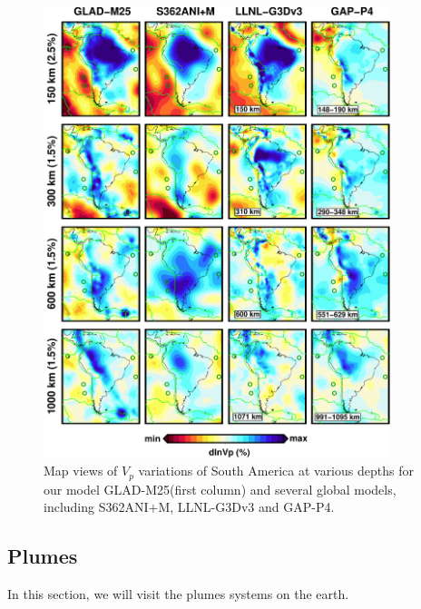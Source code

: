 \documentclass[extra,mreferee]{gji}
\begin{document}
\begin{figure}
\includegraphics[width=0.9\textwidth]{figures/depth_slice/south_america_vp.pdf}
  \caption{Map views of $V_p$ variations of South America at various depths for our model GLAD-M25(first column) and several global models, including S362ANI$+$M, LLNL-G3Dv3 and GAP-P4\citep{fukao2013subducted}.}
\label{fig:southamerica-vp}
\centering
\end{figure}

\subsection{Plumes}

In this section, we will visit the plumes systems on the earth.

\end{document}

